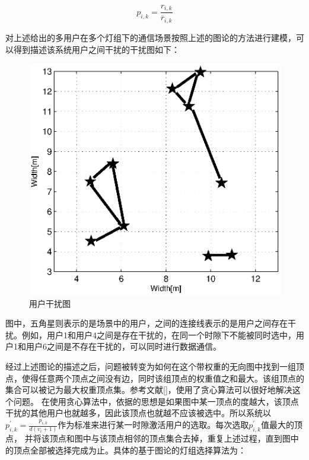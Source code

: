 \begin{equation}
    {p_{i,k}} = \frac{{{r_{i,k}}}}{{\overline {r}_{i,k} }}
\end{equation}

对上述给出的多用户在多个灯组下的通信场景按照上述的图论的方法进行建模，可以得到描述该系统用户之间干扰的干扰图如下：

\begin{figure}[htbp]
    \centering
	\includegraphics[width=\textwidth]{figures/chapter-5/InterferenceGraph.eps}
	\caption{用户干扰图}
	\label{fig:interference-graph}
\end{figure}

图中，五角星则表示的是场景中的用户，之间的连接线表示的是用户之间存在干扰。例如，用户1和用户4之间是存在干扰的，在同一个时隙下不能被同时选中，用户1和用户6之间是不存在干扰的，可以同时进行数据通信。

经过上述图论的描述之后，问题被转变为如何在这个带权重的无向图中找到一组顶点，使得任意两个顶点之间没有边，同时该组顶点的权重值之和最大。该组顶点的集合可以被记为最大权重顶点集。参考文献[]，使用了贪心算法可以很好地解决这个问题。
在使用贪心算法中，依据的思想是如果图中某一顶点的度越大，该顶点干扰的其他用户也就越多，因此该顶点也就越不应该被选中。所以系统以$p_{i,k}^{'}=\frac{p_{i,k}}{d(v_{i}+1)}$作为标准来进行某一时隙激活用户的选取。每次选取$p_{i,k}^{'}$值最大的顶点，
并将该顶点和图中与该顶点相邻的顶点集合去掉，重复上述过程，直到图中的顶点全部被选择完成为止。具体的基于图论的灯组选择算法为：

